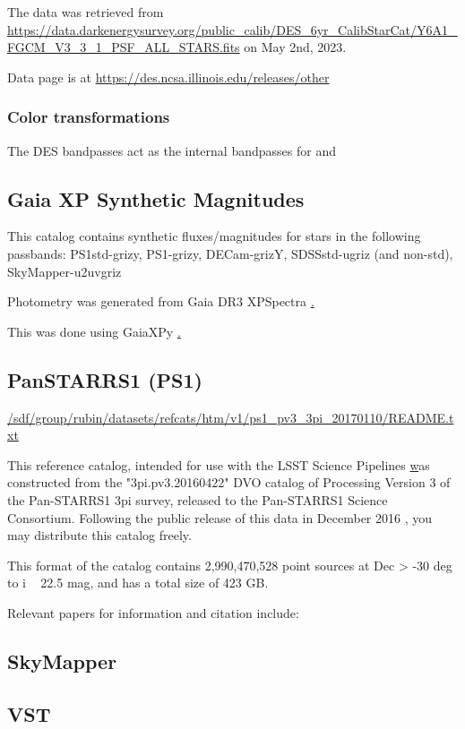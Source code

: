 The data was retrieved from \url{https://data.darkenergysurvey.org/public_calib/DES_6yr_CalibStarCat/Y6A1_FGCM_V3_3_1_PSF_ALL_STARS.fits} on May 2nd, 2023.

Data page is at \url{https://des.ncsa.illinois.edu/releases/other}

\subsubsection{Color transformations}
The DES bandpasses act as the internal bandpasses for \monster and 

\subsection{Gaia XP Synthetic Magnitudes}
\label{sec:gaiaxp}
This catalog contains synthetic fluxes/magnitudes for stars in the following passbands:
PS1std-grizy, PS1-grizy, DECam-grizY, SDSSstd-ugriz (and non-std), SkyMapper-u2uvgriz

Photometry was generated from Gaia DR3 XPSpectra \href{https://arxiv.org/abs/2206.06215}. 

This was done using GaiaXPy \href{https://github.com/gaia-dpci/GaiaXPy/cd}.

\subsection{PanSTARRS1 (PS1)}
\label{sec:ps1}
\url{/sdf/group/rubin/datasets/refcats/htm/v1/ps1_pv3_3pi_20170110/README.txt}

This reference catalog, intended for use with the LSST Science Pipelines \href{https://pipelines.lsst.io} was constructed from the "3pi.pv3.20160422" DVO catalog of Processing Version 3 of the Pan-STARRS1 3pi survey, released to the Pan-STARRS1 Science Consortium. Following the public release of this data in December 2016 \href{http://panstarrs.stsci.edu}, you may distribute this catalog freely.

This format of the catalog contains 2,990,470,528 point sources at Dec > -30 deg to i ~ 22.5 mag, and has a total size of 423 GB. 

Relevant papers for information and citation include: \citet{Chambers:2016}

\subsection{SkyMapper}
\label{sec:skymapper}
\subsection{VST}
\label{sec:vst}

